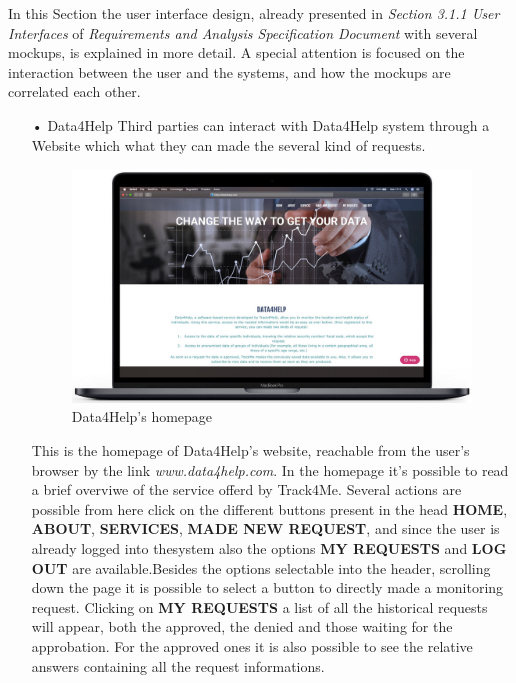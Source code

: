 \noindent
In this Section the user interface design, already presented in  \textit{Section 3.1.1 User Interfaces} of \textit{Requirements and Analysis Specification Document} with several mockups, is explained in more detail. A special attention is focused on the interaction between the user and the systems, and how the mockups are correlated each other.
\bigbreak
\noindent
\begin{enumerate}
\item[•]{\Large Data4Help}
\bigbreak
\noindent
Third parties can interact with Data4Help system through a Website which what they can made the several kind of requests.
\begin{figure}[H]
        \centering
          \includegraphics[scale = 0.33]{Images/Mockups/Homepage.jpg}
          	\caption{Data4Help's homepage}
\end{figure}
This is the homepage of Data4Help's website, reachable from the user's browser by the link \textit{www.data4help.com}. In the homepage it's possible to read a brief overviwe of the service offerd by Track4Me. Several actions are possible from here click on the different buttons present in the head \textbf{HOME}, \textbf{ABOUT}, \textbf{SERVICES}, \textbf{MADE NEW REQUEST}, and since the user is already logged into thesystem also the options \textbf{MY REQUESTS} and \textbf{LOG OUT} are available.Besides the options selectable into the header, scrolling down the page it is possible to select a button to directly made a monitoring request. 
\midbreak
\noindent
Clicking on \textbf{MY REQUESTS} a list of all the historical requests will appear, both the approved, the denied and those waiting for the approbation. For the approved ones it is also possible to see the relative answers containing all the request informations.
\clearpage


\end{enumerate}
